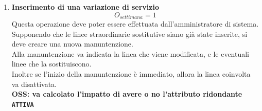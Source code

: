 \documentclass[12pt,a4paper]{report}
\begin{document}
\begin{enumerate}[label=\textbf{\arabic*}]
    \item\textbf{Inserimento di una variazione di servizio} \label{op19} \\
	\[{O_{settimana} = 1}\]
	Questa operazione deve poter essere effettuata dall'amministratore di sistema.\\
	Supponendo che le linee straordinarie sostitutive siano già state inserite, si deve creare una nuova manuntenzione.\\
	Alla manuntenzione va indicata la linea che viene modificata, e le eventuali linee che la sostituiscono.\\
	Inoltre se l'inizio della manuntenzione è immediato, allora la linea coinvolta va disattivata.\\
	\textbf{OSS: va calcolato l'impatto di avere o no l'attributo ridondante \texttt{ATTIVA}}


\end{enumerate}
\end{document}
